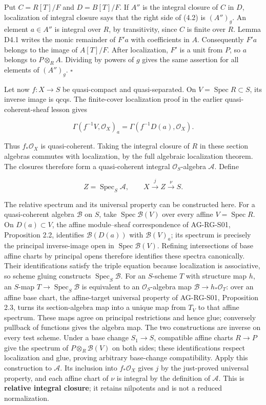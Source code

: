 \documentclass[11pt,a4paper,openany]{report}
\begin{document}
Put \(C=R[T]/F\) and \(D=B[T]/F\). If \(A''\) is the integral closure of \(C\) in \(D\), localization of integral closure says that the right side of (4.2) is \((A'')_g\). An element \(a\in A''\) is integral over \(R\), by transitivity, since \(C\) is finite over \(R\). Lemma D4.1 writes the monic remainder of \(F'a\) with coefficients in \(A\). Consequently \(F'a\) belongs to the image of \(A[T]/F\). After localization, \(F'\) is a unit from \(P\), so \(a\) belongs to \(P\otimes_RA\). Dividing by powers of \(g\) gives the same assertion for all elements of \((A'')_g\). \(\square\)

Let now \(f:X\to S\) be quasi-compact and quasi-separated. On \(V=\operatorname{Spec}R\subset S\), its inverse image is qcqs. The finite-cover localization proof in the earlier quasi-coherent-sheaf lesson gives

\[
\Gamma(f^{-1}V,\mathcal O_X)_a
=\Gamma(f^{-1}D(a),\mathcal O_X).
\]

Thus \(f_*\mathcal O_X\) is quasi-coherent. Taking the integral closure of \(R\) in these section algebras commutes with localization, by the full algebraic localization theorem. The closures therefore form a quasi-coherent integral \(\mathcal O_S\)-algebra \(\mathcal A\). Define

\[
Z=\operatorname{Spec}_S\mathcal A,\qquad
X\xrightarrow{j}Z\xrightarrow{\nu}S.                                 \tag{4.3}
\]

The relative spectrum and its universal property can be constructed here. For a quasi-coherent algebra \(\mathcal B\) on \(S\), take \(\operatorname{Spec}\mathcal B(V)\) over every affine \(V=\operatorname{Spec}R\). On \(D(a)\subset V\), the affine module--sheaf correspondence of AG-RG-S01, Proposition 2.2, identifies \(\mathcal B(D(a))\) with \(\mathcal B(V)_a\); its spectrum is precisely the principal inverse-image open in \(\operatorname{Spec}\mathcal B(V)\). Refining intersections of base affine charts by principal opens therefore identifies these spectra canonically. Their identifications satisfy the triple equation because localization is associative, so scheme gluing constructs \(\operatorname{Spec}_S\mathcal B\). For an \(S\)-scheme \(T\) with structure map \(h\), an \(S\)-map \(T\to\operatorname{Spec}_S\mathcal B\) is equivalent to an \(\mathcal O_S\)-algebra map \(\mathcal B\to h_*\mathcal O_T\): over an affine base chart, the affine-target universal property of AG-RG-S01, Proposition 2.3, turns its section-algebra map into a unique map from \(T_V\) to that affine spectrum. These maps agree on principal restrictions and hence glue; conversely pullback of functions gives the algebra map. The two constructions are inverse on every test scheme. Under a base change \(S_1\to S\), compatible affine charts \(R\to P\) give the spectrum of \(P\otimes_R\mathcal B(V)\) on both sides; these identifications respect localization and glue, proving arbitrary base-change compatibility. Apply this construction to \(\mathcal A\). Its inclusion into \(f_*\mathcal O_X\) gives \(j\) by the just-proved universal property, and each affine chart of \(\nu\) is integral by the definition of \(\mathcal A\). This is \textbf{relative integral closure}; it retains nilpotents and is not a reduced normalization.
\end{document}
